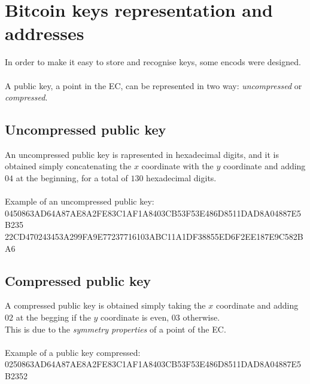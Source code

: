 
\chapter{Bitcoin keys representation and addresses}%

\label{AppendixA} %


In order to make it easy to store and recognise keys, some encods were designed.
\\ \\
A public key, a point in the EC, can be represented in two way: \textit{uncompressed} or \textit{compressed}.


\section{Uncompressed public key}
An uncompressed public key is rapresented in hexadecimal digits, and it is obtained simply concatenating the $x$ coordinate with the $y$ coordinate and adding $04$ at the beginning, for a total of $130$ hexadecimal digits. \\ \\
Example of an uncompressed public key: \\
0450863AD64A87AE8A2FE83C1AF1A8403CB53F53E486D8511DAD8A04887E5B235 22CD470243453A299FA9E77237716103ABC11A1DF38855ED6F2EE187E9C582BA6


\section{Compressed public key}
A compressed public key is obtained simply taking the $x$ coordinate and adding $02$ at the begging if the $y$ coordinate is even, $03$ otherwise. \\
This is due to the \textit{symmetry properties} of a point of the EC.
\\ \\
Example of a public key compressed:\\
0250863AD64A87AE8A2FE83C1AF1A8403CB53F53E486D8511DAD8A04887E5B2352


